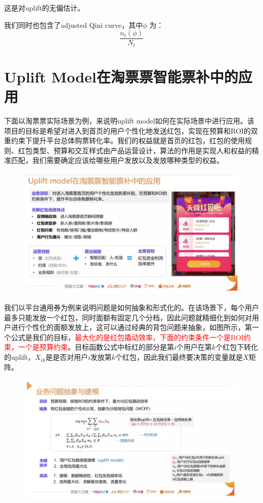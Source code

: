 \documentclass[12pt]{article}
\begin{document}
这是对uplift的无偏估计。

我们同时也包含了adjusted Qini curve，其中$\phi$ 为：
$$
\frac{n_t(\phi)}{N_t}
$$


\section{Uplift Model在淘票票智能票补中的应用}
下面以淘票票实际场景为例，来说明uplift model如何在实际场景中进行应用。该项目的目标是希望对进入到首页的用户个性化地发送红包，实现在预算和ROI的双重约束下提升平台总体购票转化率。我们的权益就是首页的红包，红包的使用规则、红包类型、预算和交互样式由产品运营设计，算法的作用是实现人和权益的精准匹配，我们需要确定应该给哪些用户发放以及发放哪种类型的权益。
\begin{figure}[H]
    \centering
    \includegraphics[width=1\textwidth]{fig/CasualInference-Uplift-Model-In-Ali.png}
\end{figure}

我们以平台通用券为例来说明问题是如何抽象和形式化的。在该场景下，每个用户最多只能发放一个红包，同时面额有固定几个分档，因此问题就精细化到如何对用户进行个性化的面额发放上，这可以通过经典的背包问题来抽象，如图所示，第一个公式是我们的目标，\textcolor{red}{最大化的是红包撬动效率，下面的约束条件一个是ROI约束，一个是预算约束}。目标函数公式中标红的部分是第$i$个用户在第$k$个红包下转化的uplift，$X_{ik}$是是否对用户$i$发放第$k$个红包，因此我们最终要决策的变量就是$X$矩阵。
\begin{figure}[H]
    \centering
    \includegraphics[width=1\textwidth]{fig/CasualInference-Uplift-Model-In-Ali2.png}
\end{figure}
\end{document}
